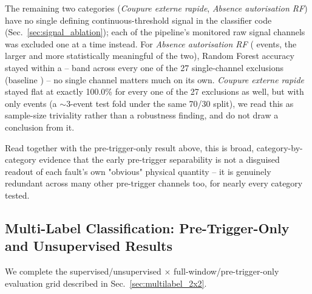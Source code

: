 The remaining two categories (\textit{Coupure externe rapide}, \textit{Absence autorisation RF}) have no single defining continuous-threshold signal in the classifier code (Sec.~\ref{sec:signal_ablation}); each of the pipeline's monitored raw signal channels was excluded one at a time instead. For \textit{Absence autorisation RF} (\MetricZeroZeroDataAttritionChainGtPassingAbsenceAutorisationRf{} events, the larger and more statistically meaningful of the two), Random Forest accuracy stayed within a \MetricSignalAblationRfauthExclPhaseCavRandomForestAccuracy{}--\MetricSignalAblationRfauthExclDPCIRandomForestAccuracy{} band across every one of the 27 single-channel exclusions (baseline \MetricSignalAblationRfauthBaselineRandomForestAccuracy) %
-- no single channel matters much on its own. \textit{Coupure externe rapide} stayed flat at exactly 100.0\% for every one of the 27 exclusions as well, but with only \MetricZeroZeroDataAttritionChainGtPassingCoupureExterneRapide{} events (a $\sim$3-event test fold under the same 70/30 split), we read this as sample-size triviality rather than a robustness finding, and do not draw a conclusion from it. %

Read together with the pre-trigger-only result above, this is broad, category-by-category evidence that the early pre-trigger separability is not a disguised readout of each fault's own "obvious" physical quantity -- it is genuinely redundant across many other pre-trigger channels too, for nearly every category tested.

\subsection{Multi-Label Classification: Pre-Trigger-Only and Unsupervised Results}
\label{sec:multilabel_2x2_results}

We complete the supervised/unsupervised $\times$ full-window/pre-trigger-only evaluation grid described in Sec.~\ref{sec:multilabel_2x2}.

